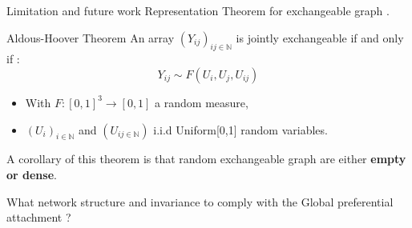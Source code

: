 %
%
%
%
%
%
%
%
%

\begin{frame}[c]{Limitation and future work}
    Representation Theorem for exchangeable graph .

    \begin{block}{Aldous-Hoover Theorem}
        An array $(Y_{ij})_{{ij}\in \mathbb{N}}$ is jointly exchangeable if and only if :
    \begin{equation}
        Y_{ij} \sim F(U_i, U_j, U_{ij})
    \end{equation}

    \begin{itemize}
        \item With $F: [0,1]^3 \rightarrow [0,1]$ a random measure, 
        \item  $(U_i)_{i\in \mathbb{N}}$ and $(U_{{ij}\in \mathbb{N}})$   i.i.d Uniform[0,1] random variables.
    \end{itemize}
    \end{block}

    A corollary of this theorem is that random exchangeable graph are either \textbf{empty or dense}.
    \vspace{1cm}

    \MVRightarrow{} What network structure and invariance to comply with the Global preferential attachment ?

\end{frame}


